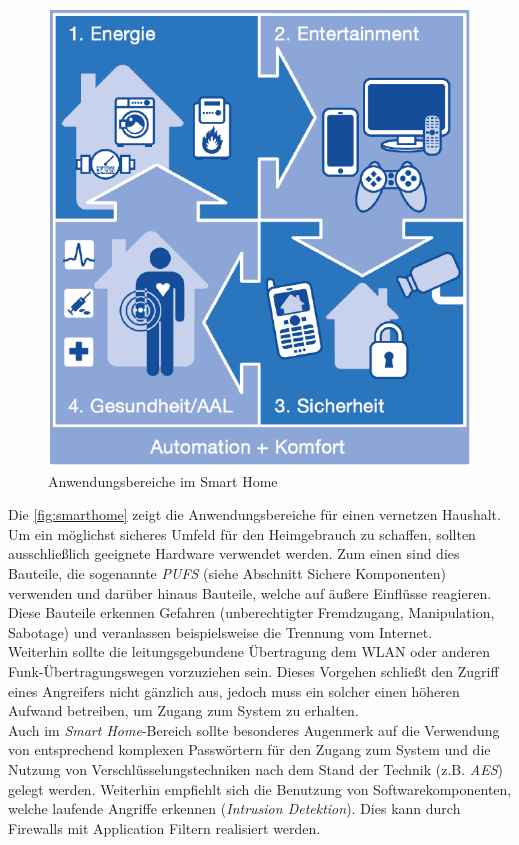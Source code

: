 \documentclass[conference]{IEEEtran}
\begin{document}
\begin{figure}[h]
\centering
  \includegraphics[width=0.7\columnwidth]{smarthome}
  \caption{Anwendungsbereiche im Smart Home}
  \label{fig:smarthome}
\end{figure}

Die \autoref{fig:smarthome} zeigt die Anwendungsbereiche für einen vernetzen Haushalt.
Um ein möglichst sicheres Umfeld für den Heimgebrauch zu schaffen, sollten ausschließlich geeignete Hardware verwendet werden. Zum einen sind dies Bauteile, die sogenannte \textit{PUFS} (siehe Abschnitt Sichere Komponenten) verwenden und darüber hinaus Bauteile, welche auf äußere Einflüsse reagieren. Diese Bauteile erkennen Gefahren (unberechtigter Fremdzugang, Manipulation, Sabotage) und veranlassen beispielsweise die Trennung vom Internet\cite{landkrim}. \\
Weiterhin sollte die leitungsgebundene Übertragung dem WLAN oder anderen Funk-Übertragungswegen vorzuziehen sein. Dieses Vorgehen schließt den Zugriff eines Angreifers nicht gänzlich aus, jedoch muss ein solcher einen höheren Aufwand betreiben, um Zugang zum System zu erhalten. \\
Auch im \textit{Smart Home}-Bereich sollte besonderes Augenmerk auf die Verwendung von entsprechend komplexen Passwörtern für den Zugang zum System und die Nutzung von Verschlüsselungstechniken nach dem Stand der Technik (z.B. \textit{AES}) gelegt werden. Weiterhin empfiehlt sich die Benutzung von Softwarekomponenten, welche laufende Angriffe erkennen (\textit{Intrusion Detektion}). Dies kann durch Firewalls mit Application Filtern realisiert werden.   
\end{document}
